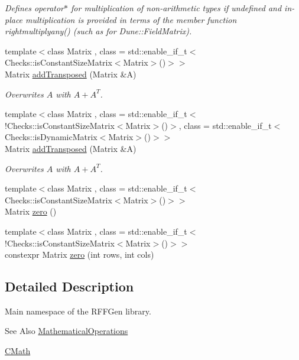 \begin{DoxyCompactItemize}
\begin{DoxyCompactList}\small\item\em Defines operator$\ast$ for multiplication of non-\/arithmetic types if undefined and in-\/place multiplication is provided in terms of the member function rightmultiplyany() (such as for Dune\-::\-Field\-Matrix). \end{DoxyCompactList}\item 
{\footnotesize template$<$class Matrix , class  = std\-::enable\-\_\-if\-\_\-t$<$\-Checks\-::is\-Constant\-Size\-Matrix$<$\-Matrix$>$()$>$$>$ }\\Matrix \hyperlink{namespaceRFFGen_aa35cec985ea0b25a40ada14189fba44d}{add\-Transposed} (Matrix \&A)
\begin{DoxyCompactList}\small\item\em Overwrites $A$ with $A+A^T$. \end{DoxyCompactList}\item 
{\footnotesize template$<$class Matrix , class  = std\-::enable\-\_\-if\-\_\-t$<$!\-Checks\-::is\-Constant\-Size\-Matrix$<$\-Matrix$>$()$>$, class  = std\-::enable\-\_\-if\-\_\-t$<$\-Checks\-::is\-Dynamic\-Matrix$<$\-Matrix$>$()$>$$>$ }\\Matrix \hyperlink{namespaceRFFGen_adef418735161dcbe64af19269329865e}{add\-Transposed} (Matrix \&A)
\begin{DoxyCompactList}\small\item\em Overwrites $A$ with $A+A^T$. \end{DoxyCompactList}\item 
{\footnotesize template$<$class Matrix , class  = std\-::enable\-\_\-if\-\_\-t$<$\-Checks\-::is\-Constant\-Size\-Matrix$<$\-Matrix$>$()$>$$>$ }\\Matrix \hyperlink{namespaceRFFGen_a63d0192aaeb22d4afe3c2f523524f3ac}{zero} ()
\item 
{\footnotesize template$<$class Matrix , class  = std\-::enable\-\_\-if\-\_\-t$<$!\-Checks\-::is\-Constant\-Size\-Matrix$<$\-Matrix$>$()$>$$>$ }\\constexpr Matrix \hyperlink{namespaceRFFGen_a0ad3b71c6132f265349b58702649eb32}{zero} (int rows, int cols)
\end{DoxyCompactItemize}


\subsection{Detailed Description}
Main namespace of the R\-F\-F\-Gen library. \begin{DoxySeeAlso}{See Also}
\hyperlink{namespaceMathematicalOperations}{Mathematical\-Operations} 

\hyperlink{namespaceCMath}{C\-Math} 
\end{DoxySeeAlso}


